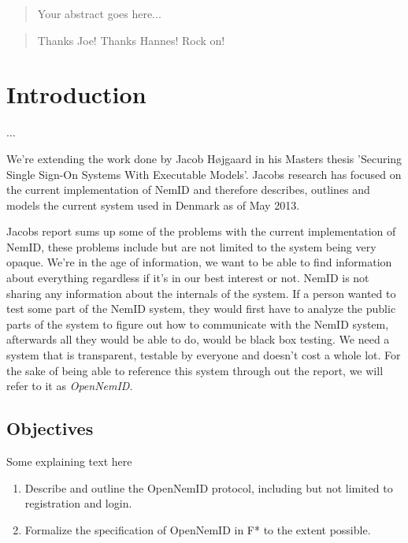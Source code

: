 \documentclass[twosided]{report}
\begin{document}
\begin{abstract}
Your abstract goes here...
\end{abstract}

\renewcommand{\abstractname}{Acknowledgements}
\begin{abstract}
Thanks Joe! Thanks Hannes! Rock on!
\end{abstract}

\begingroup
    \let\clearpage\relax
	\tableofcontents
    \listoffigures
	\lstlistoflistings
\endgroup

\chapter{Introduction}

$\ldots$
\\\par
We're extending the work done by Jacob H{\o}jgaard in his Masters thesis 'Securing Single Sign-On Systems With Executable Models'. Jacobs research has focused on the current implementation of NemID and therefore describes, outlines and models the current system used in Denmark as of May 2013.
\\\par
Jacobs report sums up some of the problems with the current implementation of NemID, these problems include but are not limited to the system being very opaque. We're in the age of information, we want to be able to find information about everything regardless if it's in our best interest or not. NemID is not sharing any information about the internals of the system. If a person wanted to test some part of the NemID system, they would first have to analyze the public parts of the system to figure out how to communicate with the NemID system, afterwards all they would be able to do, would be black box testing. We need a system that is transparent, testable by everyone and doesn't cost a whole lot. For the sake of being able to reference this system through out the report, we will refer to it as \emph{OpenNemID}.

\section{Objectives}
Some explaining text here
\par

\begin{enumerate}
	\item Describe and outline the OpenNemID protocol, including but not limited to registration and login.
	\item Formalize the specification of OpenNemID in F* to the extent possible.
\end{enumerate}
\end{document}
